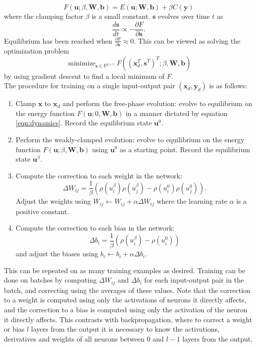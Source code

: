 \documentclass[utf8]{frontiersSCNS}
\newcommand{\mtx}[1]{\bm{#1}}
\newcommand{\npar}{\\\indent}
\DeclareMathOperator*{\minimize}{minimize}
\begin{document}
\begin{equation}
F(\mtx{u}; \beta, \mtx{W}, \mtx{b})=E(\mtx{u};\mtx{W}, \mtx{b})+\beta C(\mtx{y})
\label{eqn:total_energy}
\end{equation}
where the clamping factor $\beta$ is a small constant. $\mtx{s}$ evolves over time $t$ as
\begin{equation}
\label{eqn:dynamics}
\frac{d\mtx{s}}{dt}\propto -\frac{\partial F}{\partial \mtx{s}}.
\end{equation}
Equilibrium has been reached when $\frac{\partial F}{\partial \mtx{s}} \approx 0$. This can be viewed as solving the optimization problem
\begin{equation}
	\minimize_{\mtx{s}\in\mathbb{R}^{q+r}}F((\mtx{x}_d^T,\mtx{s}^T)^T; \beta, \mtx{W}, \mtx{b}) 
\end{equation}
by using gradient descent to find a local minimum of $F$.
\npar
The procedure for training on a single input-output pair $(\mtx{x}_d,\mtx{y}_d)$ is as follows:
\begin{enumerate}
\item Clamp $\mtx{x}$ to $\mtx{x}_d$ and perform the free-phase evolution: evolve to equilibrium on the energy function $F(\mtx{u}; 0, \mtx{W}, \mtx{b})$ in a manner dictated by equation \ref{eqn:dynamics}. Record the equilibrium state $\mtx{u}^0$.
\item Perform the weakly-clamped evolution: evolve to equilibrium on the energy function $F(\mtx{u}; \beta, \mtx{W}, \mtx{b})$ using $\mtx{u}^0$ as a starting point. Record the equilibrium state $\mtx{u}^{\beta}$.
\item Compute the correction to each weight in the network: 
\begin{equation}
\label{eqn:weight_correction}
\Delta W_{ij}=\frac{1}{\beta}(\rho(u_i^\beta)\rho(u_j^\beta)-\rho(u_i^0)\rho(u_j^0)).
\end{equation}
Adjust the weights using $W_{ij}\leftarrow W_{ij}+\alpha\Delta W_{ij}$ where the learning rate $\alpha$ is a positive constant.
\item Compute the correction to each bias in the network:
\begin{equation}
\Delta b_i=\frac{1}{\beta}(\rho(u_i^{\beta})-\rho(u_i^0))
\label{eqn:bias_correction}
\end{equation}
and adjust the biases using $b_i\leftarrow b_i+\alpha\Delta b_i$.
\end{enumerate}
This can be repeated on as many training examples as desired. Training can be done on batches by computing $\Delta W_{ij}$ and $\Delta b_i$ for each input-output pair in the batch, and correcting using the averages of these values. Note that the correction to a weight is computed using only the activations of neurons it directly affects, and the correction to a bias is computed using only the activation of the neuron it directly affects. This contrasts with backpropagation, where to correct a weight or bias $l$ layers from the output it is necessary to know the activations, derivatives and weights of all neurons between $0$ and $l-1$ layers from the output.
\end{document}
